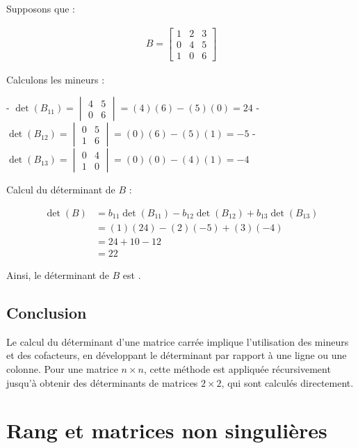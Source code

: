 \documentclass{report}
\begin{document}
\begin{multicols*}{2}
Supposons que :

\begin{align*}
    B = \begin{bmatrix}
        1 & 2 & 3 \\
        0 & 4 & 5 \\
        1 & 0 & 6
    \end{bmatrix}
\end{align*}

Calculons les mineurs :

- $\det(B_{11}) = \begin{vmatrix} 4 & 5 \\ 0 & 6 \end{vmatrix} = (4)(6) - (5)(0) = 24$
- $\det(B_{12}) = \begin{vmatrix} 0 & 5 \\ 1 & 6 \end{vmatrix} = (0)(6) - (5)(1) = -5$
- $\det(B_{13}) = \begin{vmatrix} 0 & 4 \\ 1 & 0 \end{vmatrix} = (0)(0) - (4)(1) = -4$

Calcul du déterminant de $B$ :

\begin{align*}
    \det(B) &= b_{11} \det(B_{11}) - b_{12} \det(B_{12}) + b_{13} \det(B_{13}) \\
            &= (1)(24) - (2)(-5) + (3)(-4) \\
            &= 24 + 10 - 12 \\
            &= 22
\end{align*}

Ainsi, le déterminant de $B$ est .

\subsection{Conclusion}

Le calcul du déterminant d'une matrice carrée implique l'utilisation des mineurs et des cofacteurs, en développant le déterminant par rapport à une ligne ou une colonne. Pour une matrice $n \times n$, cette méthode est appliquée récursivement jusqu'à obtenir des déterminants de matrices $2 \times 2$, qui sont calculés directement.

\section{Rang et matrices non singulières}


\end{multicols*}
\end{document}
